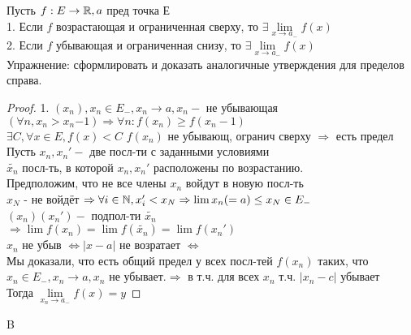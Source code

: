 Пусть $ f : E \rightarrow \mathbb{R}, a $ пред точка Е\\
1. Если $ f $ возрастающая и ограниченная сверху, то $ \exists \lim\limits_{x \rightarrow a_- } f(x) $ \\
2. Если $ f $ убывающая и ограниченная снизу, то $ \exists \lim\limits_{x \rightarrow a_- } f(x) $ \\
Упражнение: сформлировать и доказать аналогичные утверждения для пределов справа.
\begin{proof}
	1. $ (x_n), x_n \in E_-, x_n \rightarrow a, x_n - $ не убывающая $ (\forall n, x_n > x_n{-1}) \Rightarrow \forall n : f(x_n) \geq f(x_n-1) $\\
	$ \exists C, \forall x \in E, f(x) < C$
	$ f(x_n) $ не убывающ, огранич сверху $ \Rightarrow$ есть предел\\
	Пусть $ x_n, x_n' - $ две посл-ти с заданными условиями \\
	$ \widetilde{x_n} $ посл-ть, в которой $ x_n, x_n' $ расположены по возрастанию.\\
	Предположим, что не все члены $ x_n $ войдут в новую посл-ть \\
	$ x_N $ - не войдёт $ \Rightarrow \forall i \in \mathbb{N}, x_i' < x_N \Rightarrow \lim x_n (=a) \leq x_N \in E_- $\\
	$ (x_n)(x_n') - $ подпол-ти $ \widetilde{x_n} $\\
	$ \Rightarrow \lim f(x_n) = \lim f(\widetilde{x_n}) = \lim f(x_n') $ \\
	$x_n $ не убыв $\Leftrightarrow |x-a| $ не возратает $ \Leftrightarrow$\\
	Мы доказали, что есть общий предел у всех посл-тей $ f(x_n) $ таких, что $ x_n \in E_-, x_n \rightarrow a, x_n $ не убывает.$ \Rightarrow $ в т.ч. для всех $ x_n $ т.ч. $ |x_n - c| $ убывает \\	
	Тогда $ \lim\limits_{x_n \rightarrow a_-} f(x) = y $
 \end{proof}

B

